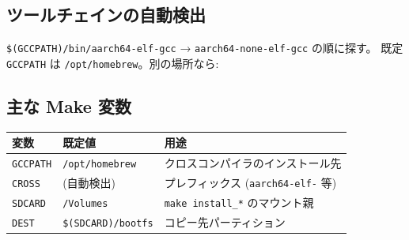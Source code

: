 \documentclass[a4paper,11pt]{ltjsarticle}
\begin{document}
\subsection{ツールチェインの自動検出}
\verb|$(GCCPATH)/bin/aarch64-elf-gcc| → \verb|aarch64-none-elf-gcc| の順に探す。
既定 \verb|GCCPATH| は \verb|/opt/homebrew|。別の場所なら:

\subsection{主な Make 変数}
\begin{center}\footnotesize
\begin{tabular}{@{}l l p{7.0cm}@{}}
\toprule
\textbf{変数} & \textbf{既定値} & \textbf{用途}\\
\midrule
\verb|GCCPATH| & \verb|/opt/homebrew| & クロスコンパイラのインストール先\\
\verb|CROSS|   & (自動検出)          & プレフィックス (\verb|aarch64-elf-| 等)\\
\verb|SDCARD|  & \verb|/Volumes|     & \verb|make install_*| のマウント親\\
\verb|DEST|    & \verb|$(SDCARD)/bootfs| & コピー先パーティション\\
\bottomrule
\end{tabular}
\end{center}
\end{document}
